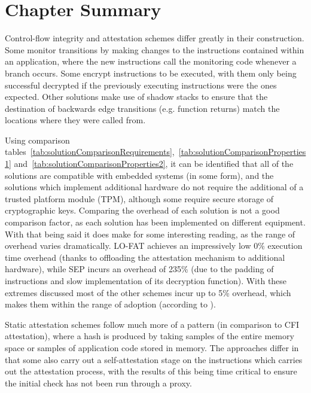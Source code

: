 \section{Chapter Summary}
Control-flow integrity and attestation schemes differ greatly in their construction. Some monitor transitions by making changes to the instructions contained within an application, where the new instructions call the monitoring code whenever a branch occurs. Some encrypt instructions to be executed, with them only being successful decrypted if the previously executing instructions were the ones expected. Other solutions make use of shadow stacks to ensure that the destination of backwards edge transitions (e.g. function returns) match the locations where they were called from.

Using comparison tables~\ref{tab:solutionComparisonRequirements},~\ref{tab:solutionComparisonProperties1} and~\ref{tab:solutionComparisonProperties2}, it can be identified that all of the solutions are compatible with embedded systems (in some form), and the solutions which implement additional hardware do not require the additional of a trusted platform module (TPM), although some require secure storage of cryptographic keys. Comparing the overhead of each solution is not a good comparison factor, as each solution has been implemented on different equipment. With that being said it does make for some interesting reading, as the range of overhead varies dramatically. LO-FAT achieves an impressively low 0\% execution time overhead (thanks to offloading the attestation mechanism to additional hardware), while SEP incurs an overhead of 235\% (due to the padding of instructions and slow implementation of its decryption function). With these extremes discussed most of the other schemes incur up to 5\% overhead, which makes them within the range of adoption (according to \cite{Szekeres2013}).

Static attestation schemes follow much more of a pattern (in comparison to CFI attestation), where a hash is produced by taking samples of the entire memory space or samples of application code stored in memory. The approaches differ in that some also carry out a self-attestation stage on the instructions which carries out the attestation process, with the results of this being time critical to ensure the initial check has not been run through a proxy. 